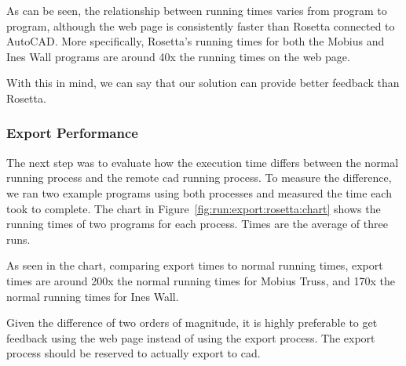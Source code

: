 As can be seen, the relationship between running times varies from program to program, although the web page is consistently faster than Rosetta connected to AutoCAD.
More specifically, Rosetta's running times for both the Mobius and Ines Wall programs are around 40x the running times on the web page.

With this in mind, we can say that our solution can provide better feedback than Rosetta.




\subsubsection{Export Performance}

The next step was to evaluate how the execution time differs between the normal running process and the remote \gls{cad} running process.
To measure the difference, we ran two example programs using both processes and measured the time each took to complete.
The chart in Figure~\ref{fig:run:export:rosetta:chart} shows the running times of two programs for each process.
Times are the average of three runs.

As seen in the chart, comparing export times to normal running times, export times are around 200x the normal running times for Mobius Truss, and 170x the normal running times for Ines Wall.

Given the difference of two orders of magnitude, it is highly preferable to get feedback using the web page instead of using the export process.
The export process should be reserved to actually export to \gls{cad}.


